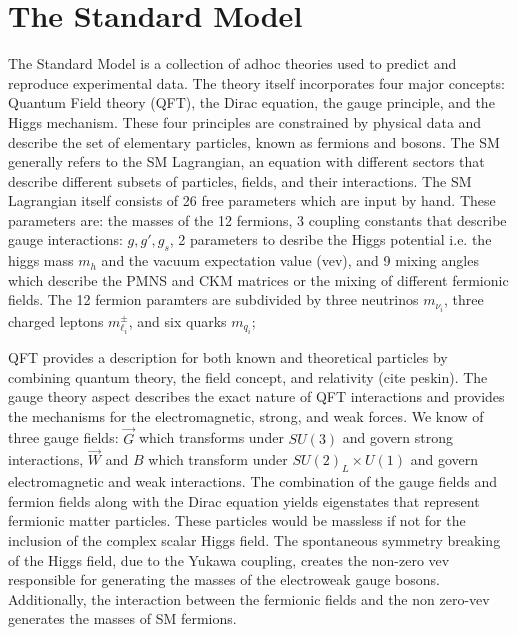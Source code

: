 \section{The Standard Model}

The Standard Model is a collection of adhoc theories used to predict and reproduce experimental data. The theory itself incorporates four major concepts: Quantum Field theory (QFT), the Dirac equation, the gauge principle, and the Higgs mechanism. These four principles are constrained by physical data and describe the set of elementary particles, known as fermions and bosons. The SM generally refers to the SM Lagrangian, an equation with different sectors that describe different subsets of particles, fields, and their interactions. The SM Lagrangian itself consists of 26 free parameters which are input by hand. These parameters are: the masses of the 12 fermions, 3 coupling constants that describe gauge interactions: $g, g', g_s$, 2 parameters to desribe the Higgs potential i.e. the higgs mass $m_h$ and the vacuum expectation value (vev), and 9 mixing angles which describe the  PMNS and CKM matrices or the mixing of different fermionic fields. The 12 fermion paramters are subdivided by three neutrinos $m_{\nu_i}$, three charged leptons $m_{\ell_i}^\pm$, and six quarks $m_{q_i}$; 

QFT provides a description for both known and theoretical particles by combining quantum theory, the field concept, and relativity (cite peskin). The gauge theory aspect describes the exact nature of QFT interactions and provides the mechanisms for the electromagnetic, strong, and weak forces.  We know of three gauge fields:  $\vec{G}$ which transforms under $SU(3)$ and govern strong interactions, $\vec{W}$ and $B$ which transform under $SU(2)_L \times U(1)$ and govern electromagnetic and weak interactions. The combination of the gauge fields and fermion fields along with the Dirac equation yields eigenstates that represent fermionic matter particles. These particles would be massless if not for the inclusion of the complex scalar Higgs field.  The spontaneous symmetry breaking of the Higgs field, due to the Yukawa coupling, creates the non-zero vev responsible for generating the masses of the electroweak gauge bosons. Additionally, the interaction between the fermionic fields and the non zero-vev generates the masses of SM fermions.

